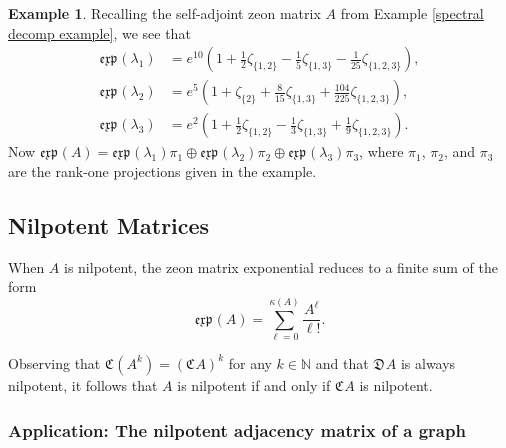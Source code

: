 \documentclass{article}
\theoremstyle{definition}
\newtheorem{example}[theorem]{Example}
\newcommand{\zexp}{\mathfrak{exp}\mspace{1mu}}
\newcommand{\zco}{\mathfrak{C}\mspace{1mu}}
\newcommand{\zdu}{\mathfrak{D}\mspace{1mu}}
\numberwithin{equation}{section}
\begin{document}
\begin{example}
Recalling the self-adjoint zeon matrix $A$ from Example \ref{spectral decomp example}, we see that \begin{align*}
\zexp(\lambda_1)&=e^{10}\left(1+\frac{1}{2} \zeta _{\{1,2\}}-\frac{1}{5} \zeta _{\{1,3\}}-\frac{1}{25} \zeta _{\{1,2,3\}}\right),\\
\zexp(\lambda_2)&=e^5\left(1+\zeta_{\{2\}}+\frac{8}{15}  \zeta _{\{1,3\}}+\frac{104}{225}  \zeta _{\{1,2,3\}}\right),\\
\zexp(\lambda_3)&=e^2\left(1+\frac{1}{2} \zeta _{\{1,2\}}-\frac{1}{3} \zeta _{\{1,3\}}+\frac{1}{9} \zeta _{\{1,2,3\}}\right).
\end{align*}
Now $\zexp(A)=\zexp(\lambda_1)\pi_1\oplus \zexp(\lambda_2)\pi_2\oplus \zexp(\lambda_3)\pi_3$, where $\pi_1$, $\pi_2$, and $\pi_3$ are the rank-one projections given in the example.

\end{example}
 
\subsection{Nilpotent Matrices}
When $A$ is nilpotent, the zeon matrix exponential reduces to a finite sum of the form
\begin{equation*}
\zexp(A)=\sum_{\ell=0}^{\kappa(A)}\frac{A^\ell}{\ell!}.
\end{equation*} 

Observing that $\zco (A^k)=(\zco A)^k$ for any $k\in \mathbb{N}$ and that $\zdu A$ is always nilpotent, it follows that $A$ is nilpotent if and only if $\zco A$ is nilpotent.

\subsubsection{Application: The nilpotent adjacency matrix of a graph}
\end{document}
